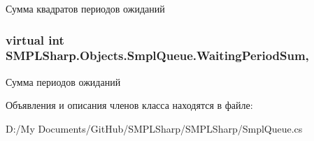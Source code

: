 Сумма квадратов периодов ожиданий 

\hypertarget{class_s_m_p_l_sharp_1_1_objects_1_1_smpl_queue_ac51a6ce05e36a4e6bb32462339a172e6}{
\subsubsection[{Waiting\-Period\-Sum}]{\setlength{\rightskip}{0pt plus 5cm}virtual int S\-M\-P\-L\-Sharp.\-Objects.\-Smpl\-Queue.\-Waiting\-Period\-Sum\hspace{0.3cm}{\ttfamily [get]}, {\ttfamily [set]}}}\label{d3/ded/class_s_m_p_l_sharp_1_1_objects_1_1_smpl_queue_ac51a6ce05e36a4e6bb32462339a172e6}


Сумма периодов ожиданий 



Объявления и описания членов класса находятся в файле\-:\begin{DoxyCompactItemize}
\item 
D\-:/\-My Documents/\-Git\-Hub/\-S\-M\-P\-L\-Sharp/\-S\-M\-P\-L\-Sharp/Smpl\-Queue.\-cs\end{DoxyCompactItemize}
